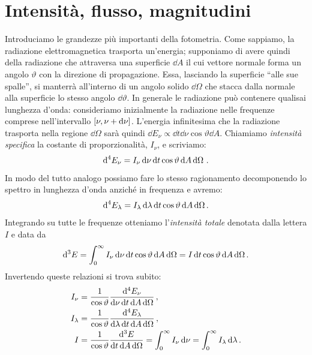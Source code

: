 \section{Intensità, flusso, magnitudini}
    Introduciamo le grandezze più importanti della fotometria. Come sappiamo, la radiazione elettromagnetica trasporta un'energia; supponiamo di avere quindi della radiazione che attraversa una superficie $\dd A$ il cui vettore normale forma un angolo $\vartheta$ con la direzione di propagazione. Essa, lasciando la superficie ``alle sue spalle'', si manterrà all'interno di un angolo solido $\dd\Omega$ che stacca dalla normale alla superficie lo stesso angolo $\dd\vartheta$. In generale le radiazione può contenere qualisai lunghezza d'onda: consideriamo inizialmente la radiazione nelle frequenze comprese nell'intervallo  $\bqty{\nu,\nu + \dd\nu}$. L'energia infinitesima che la radiazione trasporta nella regione $\dd\Omega$ sarà quindi $\dd E_\nu \propto \dd t \dd\nu \cos\vartheta\dd A$. Chiamiamo \emph{intensità specifica} la costante di proporzionalità, $I_\nu$, e scriviamo:
    \begin{equation}
        \label{intensità-specifica-freq}
        \dd[4] E_\nu = I_{\nu} \dd{\nu} \dd{t} \cos{\vartheta} \dd{A} \dd{\Omega}
        \,.
    \end{equation}
    In modo del tutto analogo possiamo fare lo stesso ragionamento decomponendo lo spettro in lunghezza d'onda anziché in frequenza e avremo:
    \begin{equation}
        \label{intensità-specifica-lambda}
        \dd[4] E_\lambda = I_\lambda \,\dd\lambda\,\dd t\cos\vartheta\,\dd A \,\dd\Omega
        \,.
    \end{equation}
    Integrando su tutte le frequenze otteniamo l'\emph{intensità totale} denotata dalla lettera $I$ e data da
    \begin{equation*}
        \label{intensità-totale}
        \dd[3] E = \int_{0}^{\infty}I_\nu \,\dd\nu\,\dd t\cos\vartheta\,\dd A \,\dd\Omega = I \,\dd t\cos\vartheta\,\dd A \,\dd\Omega
        \,.
    \end{equation*}
    Invertendo queste relazioni si trova subito:
    \begin{align}
        I_\nu &= \frac{1}{\cos\vartheta}\frac{\dd[4] E_\nu}{\dd{\nu} \dd{t} \dd{A} \dd{\Omega}} \,, \\
        I_\lambda &= \frac{1}{\cos\vartheta}\frac{\dd[4] E_\lambda}{\dd{\lambda} \dd{t} \dd{A} \dd{\Omega}}
        \,, \\
        I &= \frac{1}{\cos\vartheta}\frac{\dd[3] E}{\dd t \dd{A} \dd{\Omega}}
        = \int_{0}^{\infty}I_\nu \,\dd\nu
        = \int_{0}^{\infty}I_\lambda \,\dd\lambda
        \,.
    \end{align}
